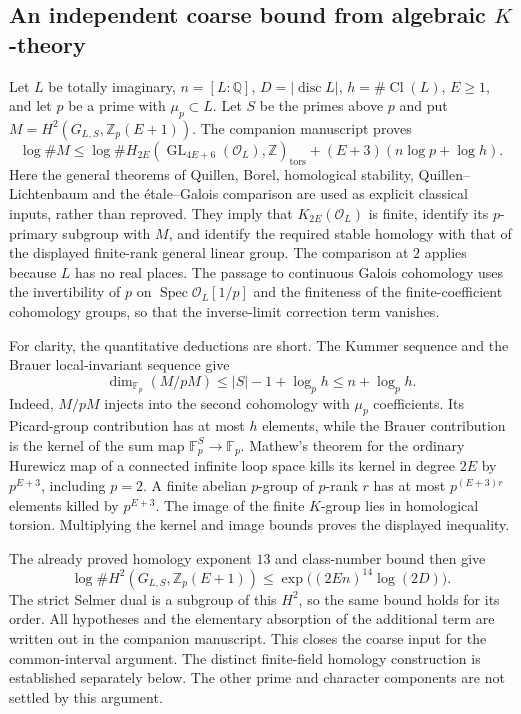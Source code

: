 \documentclass[11pt,a4paper]{article}
\theoremstyle{remark}
\newcommand{\Z}{\mathbb Z}
\newcommand{\Q}{\mathbb Q}
\begin{document}
\subsection{An independent coarse bound from algebraic \texorpdfstring{$K$}{K}-theory}

Let $L$ be totally imaginary, $n=[L:\Q]$, $D=|\operatorname{disc}L|$,
$h=\#\operatorname{Cl}(L)$, $E\ge1$, and let $p$ be a prime
with $\mu_p\subset L$. Let $S$ be the primes above $p$ and put
$M=H^2(G_{L,S},\Z_p(E+1))$. The companion manuscript proves
\[
 \log\#M\le \log\#H_{2E}(\operatorname{GL}_{4E+6}(\mathcal O_L),\Z)_{\mathrm{tors}}
       +(E+3)(n\log p+\log h).
\]
Here the general theorems of Quillen, Borel, homological stability,
Quillen--Lichtenbaum and the \'etale--Galois comparison are used
as explicit classical inputs, rather than reproved.
They imply that $K_{2E}(\mathcal O_L)$ is finite, identify its
$p$-primary subgroup with $M$, and identify the required stable
homology with that of the displayed finite-rank general linear group.
The comparison at $2$ applies because $L$ has no real
places.\cite[IV, 1.14.1, 1.17--1.18, 6.9; VI, 8.2--8.3]{weibel-kbook}
The passage to continuous Galois cohomology uses the invertibility
of $p$ on $\operatorname{Spec}\mathcal O_L[1/p]$ and the finiteness
of the finite-coefficient cohomology groups, so that the inverse-limit
correction term vanishes.\cite[II, 2.9 and 2.13]{milne-adt}

For clarity, the quantitative deductions are short. The Kummer
sequence and the Brauer local-invariant sequence give
\[
 \dim_{\mathbb F_p}(M/pM)\le |S|-1+\log_p h\le n+\log_p h.
\]
Indeed, $M/pM$ injects into the second cohomology with
$\mu_p$ coefficients. Its Picard-group contribution has at
most $h$ elements, while the Brauer contribution is the kernel
of the sum map $\mathbb F_p^S\to\mathbb F_p$.
Mathew's theorem for the ordinary Hurewicz map of a connected
infinite loop space kills its kernel in degree $2E$ by
$p^{E+3}$, including $p=2$.\cite[Theorem 6.3]{mathew-hurewicz}
A finite abelian $p$-group of $p$-rank $r$ has at most
$p^{(E+3)r}$ elements killed by $p^{E+3}$. The image of the
finite $K$-group lies in homological torsion. Multiplying the
kernel and image bounds proves the displayed inequality.

The already proved homology exponent $13$ and class-number bound
then give
\[
 \log\#H^2(G_{L,S},\Z_p(E+1))
       \le\exp\bigl((2En)^{14}\log(2D)\bigr).
\]
The strict Selmer dual is a subgroup of this $H^2$, so the same
bound holds for its order. All hypotheses and the elementary
absorption of the additional term are written out in the
companion manuscript. This closes the coarse input for the
common-interval argument. The distinct finite-field homology
construction is established separately below. The other prime
and character components are not settled by this argument.
\end{document}
